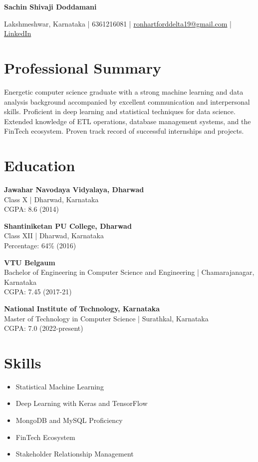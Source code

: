 \documentclass[a4paper,10pt]{article}
\begin{document}
\begin{center}
    \textbf{\LARGE Sachin Shivaji Doddamani}
    
    Lakshmeshwar, Karnataka | 6361216081 | \href{mailto:ronhartforddelta19@gmail.com}{ronhartforddelta19@gmail.com} | \href{https://www.linkedin.com/in/sachin-doddamani-531a5a174/}{LinkedIn}
\end{center}

\section*{Professional Summary}
    Energetic computer science graduate with a strong machine learning and data analysis background accompanied by excellent communication and interpersonal skills. Proficient in deep learning and statistical techniques for data science. Extended knowledge of ETL operations, database management systems, and the FinTech ecosystem. Proven track record of successful internships and projects.

\section*{Education}
    \textbf{Jawahar Navodaya Vidyalaya, Dharwad }\\
    Class X | Dharwad, Karnataka\\
    CGPA: 8.6 (2014)
    
    \textbf{Shantiniketan PU College, Dharwad }\\
    Class XII | Dharwad, Karnataka\\
    Percentage: 64\% (2016)
    
    \textbf{VTU Belgaum }\\
    Bachelor of Engineering in Computer Science and Engineering | Chamarajanagar, Karnataka\\
    CGPA: 7.45 (2017-21)
    
    \textbf{National Institute of Technology, Karnataka }\\
    Master of Technology in Computer Science | Surathkal, Karnataka\\
    CGPA: 7.0 (2022-present)

\section*{Skills}
    \begin{itemize}
        \item Statistical Machine Learning
        \item Deep Learning with Keras and TensorFlow
        \item MongoDB and MySQL Proficiency
        \item FinTech Ecosystem 
        \item Stakeholder Relationship Management
    \end{itemize}
\end{document}
